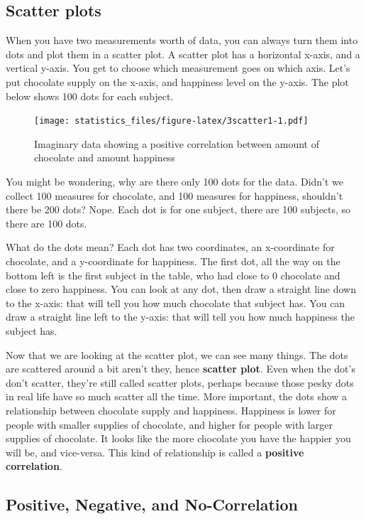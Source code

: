 \documentclass[]{book}
\begin{document}
\hypertarget{scatter-plots}{%
\subsection{Scatter plots}\label{scatter-plots}}

When you have two measurements worth of data, you can always turn them into dots and plot them in a scatter plot. A scatter plot has a horizontal x-axis, and a vertical y-axis. You get to choose which measurement goes on which axis. Let's put chocolate supply on the x-axis, and happiness level on the y-axis. The plot below shows 100 dots for each subject.

\begin{figure}
\centering
\texttt{[image: statistics\_files/figure-latex/3scatter1-1.pdf]}
\caption{\label{fig:3scatter1}Imaginary data showing a positive correlation between amount of chocolate and amount happiness}
\end{figure}

You might be wondering, why are there only 100 dots for the data. Didn't we collect 100 measures for chocolate, and 100 measures for happiness, shouldn't there be 200 dots? Nope. Each dot is for one subject, there are 100 subjects, so there are 100 dots.

What do the dots mean? Each dot has two coordinates, an x-coordinate for chocolate, and a y-coordinate for happiness. The first dot, all the way on the bottom left is the first subject in the table, who had close to 0 chocolate and close to zero happiness. You can look at any dot, then draw a straight line down to the x-axis: that will tell you how much chocolate that subject has. You can draw a straight line left to the y-axis: that will tell you how much happiness the subject has.

Now that we are looking at the scatter plot, we can see many things. The dots are scattered around a bit aren't they, hence \textbf{scatter plot}. Even when the dot's don't scatter, they're still called scatter plots, perhaps because those pesky dots in real life have so much scatter all the time. More important, the dots show a relationship between chocolate supply and happiness. Happiness is lower for people with smaller supplies of chocolate, and higher for people with larger supplies of chocolate. It looks like the more chocolate you have the happier you will be, and vice-versa. This kind of relationship is called a \textbf{positive correlation}.

\hypertarget{positive-negative-and-no-correlation}{%
\subsection{Positive, Negative, and No-Correlation}\label{positive-negative-and-no-correlation}}
\end{document}
